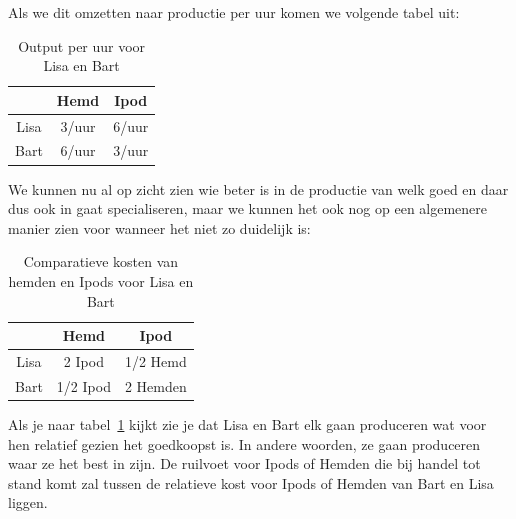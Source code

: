 Als we dit omzetten naar productie per uur komen we volgende tabel uit:

\begin{table}[h]
	\centering
    \begin{tabular}{ | c |  c |  c | }
		\hline
		& Hemd  &  Ipod \\
		\hline
		 Lisa & 3/uur & 6/uur \\
		\hline
		Bart & 6/uur & 3/uur\\
		\hline
	\end{tabular}
	\caption{Output per uur voor Lisa en Bart}
\end{table}

We kunnen nu al op zicht zien wie beter is in de productie van welk goed en daar dus ook in gaat specialiseren, maar we kunnen het ook nog op een algemenere manier zien voor wanneer het niet zo duidelijk is:

\begin{table}[h]
	\centering
    \begin{tabular}{ | c |  c |  c | }
		\hline
		& Hemd  &  Ipod \\
		\hline
		 Lisa & 2 Ipod & 1/2 Hemd \\
		\hline
		Bart & 1/2 Ipod & 2 Hemden\\
		\hline
	\end{tabular}
	\caption{Comparatieve kosten van hemden en Ipods voor Lisa en Bart}
    \label{table:sec1:compCost}
\end{table}

Als je naar tabel~\ref{table:sec1:compCost} kijkt zie je dat Lisa en Bart elk gaan produceren wat voor hen relatief gezien het goedkoopst is. In andere woorden, ze gaan produceren waar ze het best in zijn. De ruilvoet voor Ipods of Hemden die bij handel tot stand komt zal tussen de relatieve kost voor Ipods of Hemden van Bart en Lisa liggen.

